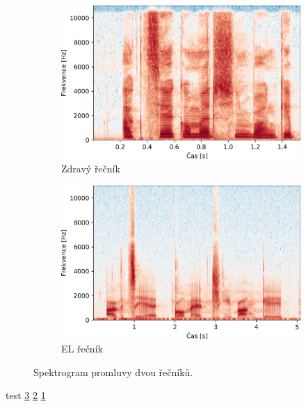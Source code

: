 \begin{figure}[htpb]
  \centering
  \begin{subfigure}[b]{0.4\textwidth}
    \includegraphics[width=\textwidth]{./ch4-experiments/img/spectrogram0.png}
    \caption{Zdravý řečník}
    \label{fig:experiments:analysis:spectrogram:normal}
  \end{subfigure}
  \begin{subfigure}[b]{0.4\textwidth}
    \includegraphics[width=\textwidth]{./ch4-experiments/img/spectrogram1.png}
    \caption{EL řečník}
    \label{fig:experiments:analysis:spectrogram:el}
  \end{subfigure}
  \caption{Spektrogram promluvy  dvou řečníků.}
  \label{fig:experiments:analysis:spectrogram}
\end{figure}

test \ref{fig:experiments:analysis:spectrogram} \ref{fig:experiments:analysis:spectrogram:el} \ref{fig:experiments:analysis:spectrogram:normal}

